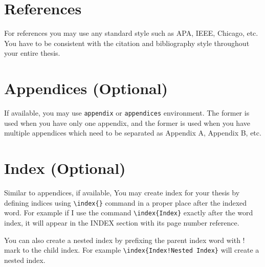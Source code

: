 \documentclass[a4paper,12pt,oneside]{report}
\begin{document}


\section{References}\label{sec:references}
For references you may use any standard style such as APA, IEEE, Chicago, etc. You have to be consistent with the citation and bibliography style throughout your entire thesis.

\section{Appendices (Optional)}\label{sec:appendices}
If available, you may use \texttt{appendix} or \texttt{appendices} environment. The former is used when you have only one appendix, and the former is used when you have multiple appendices which need to be separated as Appendix A, Appendix B, etc.

\section{Index (Optional)}\label{sec:index}
Similar to appendices, if available, You may create index for your thesis by defining indices using \texttt{\textbackslash{index}\{\}} command in a proper place after the indexed word. For example if I use the command \texttt{\textbackslash{index}\{Index\}} exactly after the word index, it will appear in the INDEX section with its page number reference. 

You can also create a nested index by prefixing the parent index word with ! mark to the child index. For example \texttt{\textbackslash{index}\{Index!Nested Index\}} will create a nested index.

\end{document}
